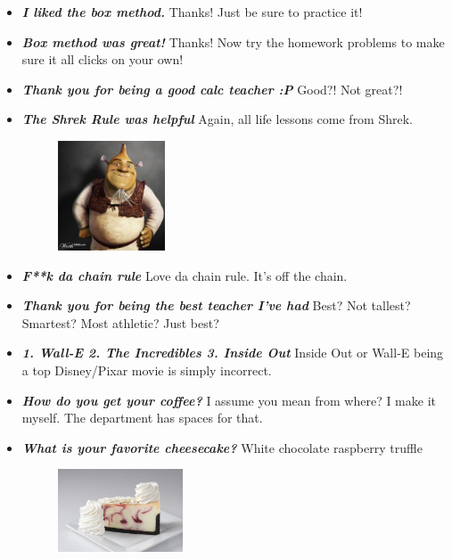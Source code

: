 \documentclass[11pt,letterpaper]{article}
\begin{document}
\begin{itemize}
\item {\bfseries\itshape I liked the box method.} Thanks! Just be sure to practice it!

\item {\bfseries\itshape Box method was great!} Thanks! Now try the homework problems to make sure it all clicks on your own!

\item {\bfseries\itshape Thank you for being a good calc teacher :P } Good?! Not great?!

\item {\bfseries\itshape The Shrek Rule was helpful} Again, all life lessons come from Shrek. 
	\begin{figure}[H]
	\centering
	\includegraphics[width=0.30\textwidth]{images/onion.jpg}
	\end{figure}

\item {\bfseries\itshape F**k da chain rule} Love da chain rule. It's off the chain.

\item {\bfseries\itshape Thank you for being the best teacher I've had} Best? Not tallest? Smartest? Most athletic? Just best?

\item {\bfseries\itshape 1. Wall-E 2. The Incredibles 3. Inside Out}  Inside Out or Wall-E being a top Disney/Pixar movie is simply incorrect. 

\item {\bfseries\itshape How do you get your coffee?} I assume you mean from where? I make it myself. The department has spaces for that. 

\item {\bfseries\itshape What is your favorite cheesecake?} White chocolate raspberry truffle
	\begin{figure}[H]
	\centering
	\includegraphics[width=0.35\textwidth]{images/wcrt.png}
	\end{figure}


\end{itemize}
\end{document}
